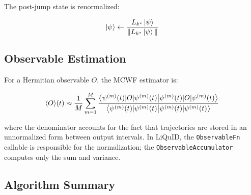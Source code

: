 \documentclass[11pt,a4paper,twoside]{book}
\newcommand{\code}[1]{\texttt{\small#1}}
\theoremstyle{definition}
\theoremstyle{remark}
\begin{document}
The post-jump state is renormalized:

\begin{equation}
  \ket{\psi} \leftarrow \frac{L_{k^*}\ket{\psi}}{\|L_{k^*}\ket{\psi}\|}
  \label{eq:post-jump}
\end{equation}

\subsection{Observable Estimation}
\label{subsec:observables}

For a Hermitian observable $O$, the MCWF estimator is:

\begin{equation}
  \langle O \rangle(t)
    \approx \frac{1}{M} \sum_{m=1}^{M}
      \frac{\braket{\psi^{(m)}(t)|O|\psi^{(m)}(t)}}
           {\braket{\psi^{(m)}(t)|\psi^{(m)}(t)}}
  \label{eq:observable-est}
\end{equation}

where the denominator accounts for the fact that trajectories are stored
in an unnormalized form between output intervals. In LiQuID, the
\code{ObservableFn} callable is responsible for the normalization;
the \code{ObservableAccumulator} computes only the sum and variance.

\subsection{Algorithm Summary}
\label{subsec:algorithm-summary}
\end{document}
